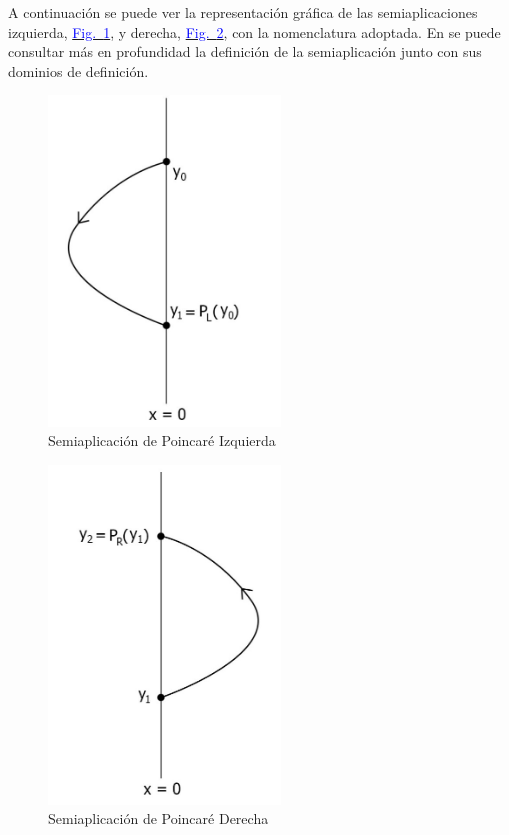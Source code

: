 \documentclass[12pt,a4paper]{report} %
\newcommand{\fref}[1]{\hyperref[#1]{\textcolor{blue}{Fig.~\ref*{#1}}}}
\begin{document}
	
	\newpage
	
	\vspace{0.5cm} A continuación se puede ver la representación gráfica de las semiaplicaciones izquierda, \fref{fig:semiL}, y derecha, \fref{fig:semiR}, con la nomenclatura adoptada. En \cite{caracterizacion} se puede consultar más en profundidad la definición de la semiaplicación junto con sus dominios de definición.

	
	\begin{figure}[h]
		\centering
		\includegraphics[width=0.55\textwidth]{semiL.jpg}
		\caption{Semiaplicación de Poincaré Izquierda}
		\label{fig:semiL}
	\end{figure}\smallskip
	

	
	\newpage
	
	\begin{figure}[h]
		\centering
		\includegraphics[width=0.55\textwidth]{semiR.jpg}
		\caption{Semiaplicación de Poincaré Derecha}
		\label{fig:semiR}
	\end{figure}\smallskip
\end{document}
